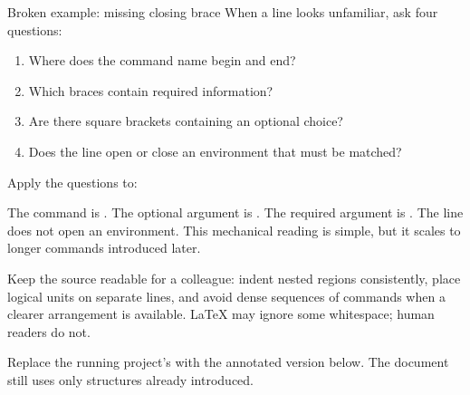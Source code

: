 \begin{latexcode}{Broken example: missing closing brace}
When a line looks unfamiliar, ask four questions:

\begin{enumerate}
  \item Where does the command name begin and end?
  \item Which braces contain required information?
  \item Are there square brackets containing an optional choice?
  \item Does the line open or close an environment that must be matched?
\end{enumerate}

Apply the questions to:


The command is . The optional argument is
\optional{12pt}. The required argument is . The line does
not open an environment. This mechanical reading is simple, but it scales to
longer commands introduced later.

\begin{goodpractice}
Keep the source readable for a colleague: indent nested regions consistently,
place logical units on separate lines, and avoid dense sequences of commands
when a clearer arrangement is available. \LaTeX{} may ignore some whitespace;
human readers do not.
\end{goodpractice}

\chapterproject

\begin{miniproject}
Replace the running project's  with the annotated version below.
The document still uses only structures already introduced.



\end{miniproject}
\end{latexcode}
